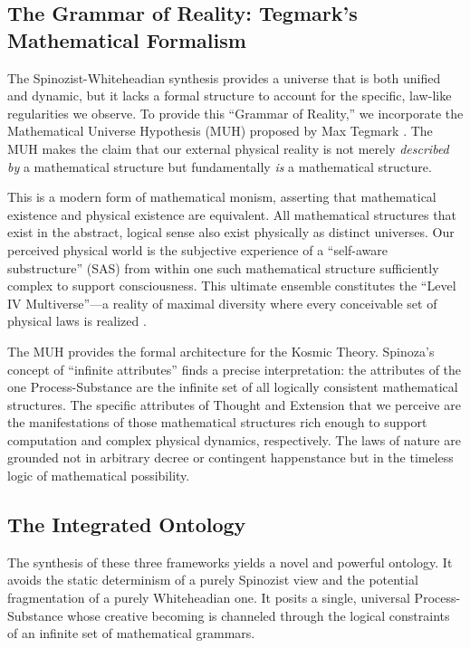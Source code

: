 \documentclass[12pt,a4paper]{article}
\begin{document}
\subsection{The Grammar of Reality: Tegmark's Mathematical Formalism}
\label{sec:tegmark}

The Spinozist-Whiteheadian synthesis provides a universe that is both
unified and dynamic, but it lacks a formal structure to account for the
specific, law-like regularities we observe.  To provide this ``Grammar of
Reality,'' we incorporate the Mathematical Universe Hypothesis (MUH)
proposed by Max Tegmark \citep{tegmark2008,tegmark2014}.  The MUH makes the
claim that our external physical reality is not merely \emph{described by}
a mathematical structure but fundamentally \emph{is} a mathematical
structure.

This is a modern form of mathematical monism, asserting that mathematical
existence and physical existence are equivalent.  All mathematical
structures that exist in the abstract, logical sense also exist physically
as distinct universes.  Our perceived physical world is the subjective
experience of a ``self-aware substructure'' (SAS) from within one such
mathematical structure sufficiently complex to support consciousness.  This
ultimate ensemble constitutes the ``Level IV Multiverse''---a reality of
maximal diversity where every conceivable set of physical laws is realized
\citep{tegmark2014}.

The MUH provides the formal architecture for the Kosmic Theory.  Spinoza's
concept of ``infinite attributes'' finds a precise interpretation: the
attributes of the one Process-Substance are the infinite set of all
logically consistent mathematical structures.  The specific attributes of
Thought and Extension that we perceive are the manifestations of those
mathematical structures rich enough to support computation and complex
physical dynamics, respectively.  The laws of nature are grounded not in
arbitrary decree or contingent happenstance but in the timeless logic of
mathematical possibility.

\subsection{The Integrated Ontology}
\label{sec:ontology}

The synthesis of these three frameworks yields a novel and powerful
ontology.  It avoids the static determinism of a purely Spinozist view and
the potential fragmentation of a purely Whiteheadian one.  It posits a
single, universal Process-Substance whose creative becoming is channeled
through the logical constraints of an infinite set of mathematical
grammars.
\end{document}
